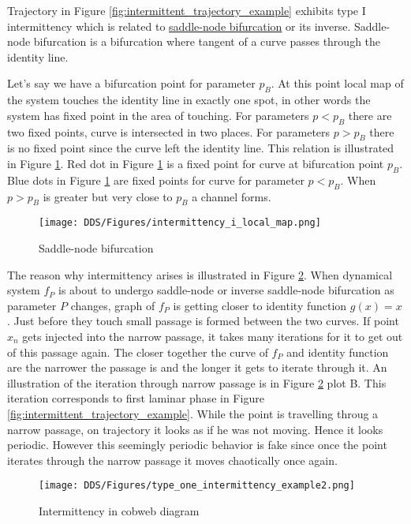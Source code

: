 Trajectory in Figure \ref{fig:intermittent_trajectory_example} exhibits type I intermittency which is related to \hyperref[def:saddle_node_bif]{saddle-node bifurcation} or its inverse.
Saddle-node bifurcation is a bifurcation where tangent of a curve passes through the identity line.
\par
Let's say we have a bifurcation point for parameter $p_{B}$.
At this point local map of the system touches the identity line in exactly one spot, in other words the system has fixed point in the area of touching.
For parameters $p < p_{B}$ there are two fixed points, curve is intersected in two places.
For parameters $p > p_{B}$ there is no fixed point since the curve left the identity line.
This relation is illustrated in Figure \ref{fig:saddle_node_bifurcation}.
Red dot in Figure \ref{fig:saddle_node_bifurcation} is a fixed point for curve at bifurcation point $p_{B}$.
Blue dots in Figure \ref{fig:saddle_node_bifurcation} are fixed points for curve for parameter $p < p_{B}$.
When $p > p_{B}$ is greater but very close to $p_{B}$ a channel forms.
\begin{figure}[!h]
    \centering
    \texttt{[image: DDS/Figures/intermittency\_i\_local\_map.png]}
    \caption{Saddle-node bifurcation}
    \label{fig:saddle_node_bifurcation}
\end{figure}


The reason why intermittency arises is illustrated in Figure \ref{fig:intermittent_cobweb_example}.
When dynamical system $f_P$ is about to undergo saddle-node or inverse saddle-node bifurcation as parameter $P$ changes, graph of $f_P$ is getting closer to identity function $g(x)=x$.
Just before they touch small passage is formed between the two curves.
If point $x_n$ gets injected into the narrow passage, it takes many iterations for it to get out of this passage again.
The closer together the curve of $f_P$ and identity function are the narrower the passage is and the longer it gets to iterate through it.
An illustration of the iteration through narrow passage is in Figure \ref{fig:intermittent_cobweb_example} plot B.
This iteration corresponds to first laminar phase in Figure \ref{fig:intermittent_trajectory_example}.
While the point is travelling throug a narrow passage, on trajectory it looks as if he was not moving.
Hence it looks periodic.
However this seemingly periodic behavior is fake since once the point iterates through the narrow passage it moves chaotically once again.

\begin{figure}[!h]
    \centering
    \texttt{[image: DDS/Figures/type\_one\_intermittency\_example2.png]}
    \caption{Intermittency in cobweb diagram}
    \label{fig:intermittent_cobweb_example}
\end{figure}

